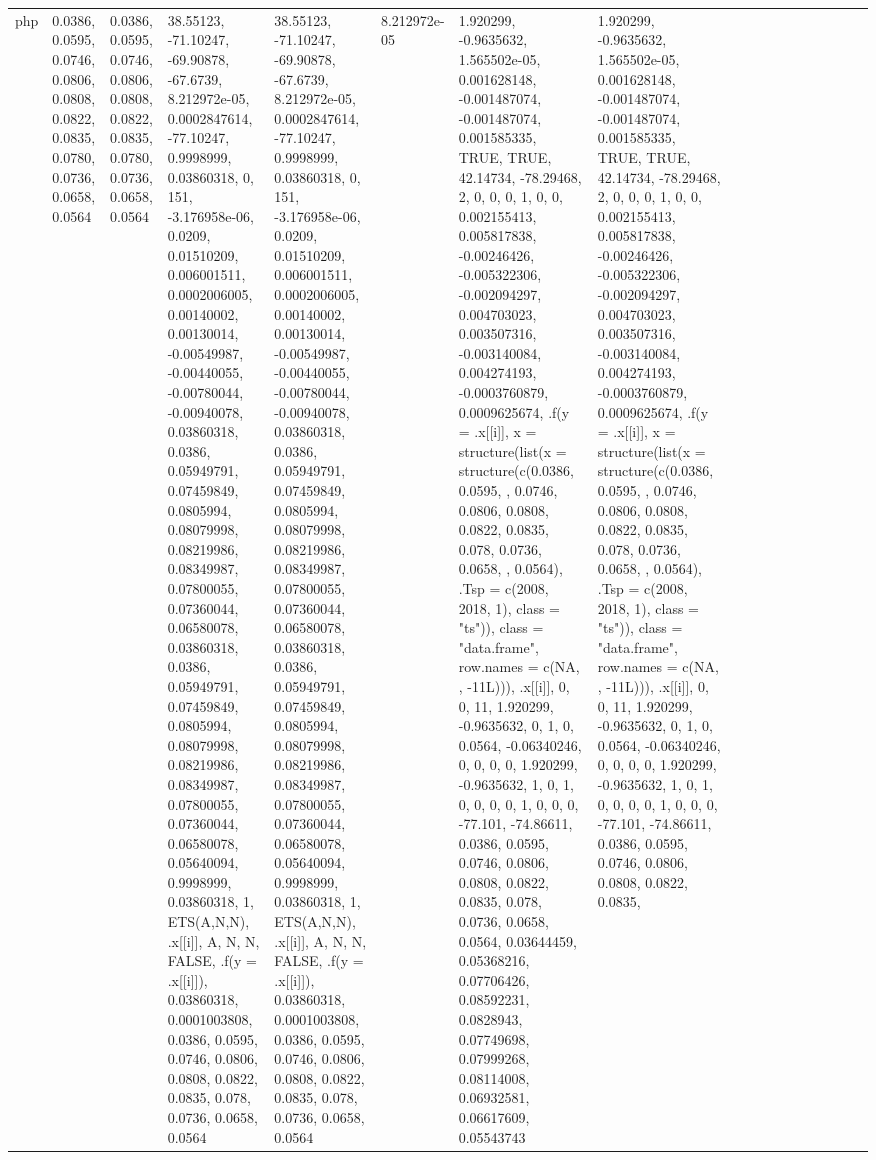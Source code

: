 \documentclass[
]{article}
\begin{document}
\begin{table}
\begin{tabular}{l|l|l|l|l|l|l|l|l|l|l|r|l|r|r|r|r|r}
php & 0.0386, 0.0595, 0.0746, 0.0806, 0.0808, 0.0822, 0.0835, 0.0780, 0.0736, 0.0658, 0.0564 & 0.0386, 0.0595, 0.0746, 0.0806, 0.0808, 0.0822, 0.0835, 0.0780, 0.0736, 0.0658, 0.0564 & 38.55123, -71.10247, -69.90878, -67.6739, 8.212972e-05, 0.0002847614, -77.10247, 0.9998999, 0.03860318, 0, 151, -3.176958e-06, 0.0209, 0.01510209, 0.006001511, 0.0002006005, 0.00140002, 0.00130014, -0.00549987, -0.00440055, -0.00780044, -0.00940078, 0.03860318, 0.0386, 0.05949791, 0.07459849, 0.0805994, 0.08079998, 0.08219986, 0.08349987, 0.07800055, 0.07360044, 0.06580078, 0.03860318, 0.0386, 0.05949791, 0.07459849, 0.0805994, 0.08079998, 0.08219986, 0.08349987, 0.07800055, 0.07360044, 0.06580078, 0.05640094, 0.9998999, 0.03860318, 1, ETS(A,N,N), .x[[i]], A, N, N, FALSE, .f(y = .x[[i]]), 0.03860318, 0.0001003808, 0.0386, 0.0595, 0.0746, 0.0806, 0.0808, 0.0822, 0.0835, 0.078, 0.0736, 0.0658, 0.0564 & 38.55123, -71.10247, -69.90878, -67.6739, 8.212972e-05, 0.0002847614, -77.10247, 0.9998999, 0.03860318, 0, 151, -3.176958e-06, 0.0209, 0.01510209, 0.006001511, 0.0002006005, 0.00140002, 0.00130014, -0.00549987, -0.00440055, -0.00780044, -0.00940078, 0.03860318, 0.0386, 0.05949791, 0.07459849, 0.0805994, 0.08079998, 0.08219986, 0.08349987, 0.07800055, 0.07360044, 0.06580078, 0.03860318, 0.0386, 0.05949791, 0.07459849, 0.0805994, 0.08079998, 0.08219986, 0.08349987, 0.07800055, 0.07360044, 0.06580078, 0.05640094, 0.9998999, 0.03860318, 1, ETS(A,N,N), .x[[i]], A, N, N, FALSE, .f(y = .x[[i]]), 0.03860318, 0.0001003808, 0.0386, 0.0595, 0.0746, 0.0806, 0.0808, 0.0822, 0.0835, 0.078, 0.0736, 0.0658, 0.0564 & 8.212972e-05 & 1.920299, -0.9635632, 1.565502e-05, 0.001628148, -0.001487074, -0.001487074, 0.001585335, TRUE, TRUE, 42.14734, -78.29468, 2, 0, 0, 0, 1, 0, 0, 0.002155413, 0.005817838, -0.00246426, -0.005322306, -0.002094297, 0.004703023, 0.003507316, -0.003140084, 0.004274193, -0.0003760879, 0.0009625674, .f(y = .x[[i]], x = structure(list(x = structure(c(0.0386, 0.0595, , 0.0746, 0.0806, 0.0808, 0.0822, 0.0835, 0.078, 0.0736, 0.0658, , 0.0564), .Tsp = c(2008, 2018, 1), class = "ts")), class = "data.frame", row.names = c(NA, , -11L))), .x[[i]], 0, 0, 11, 1.920299, -0.9635632, 0, 1, 0, 0.0564, -0.06340246, 0, 0, 0, 0, 1.920299, -0.9635632, 1, 0, 1, 0, 0, 0, 0, 1, 0, 0, 0, -77.101, -74.86611, 0.0386, 0.0595, 0.0746, 0.0806, 0.0808, 0.0822, 0.0835, 0.078, 0.0736, 0.0658, 0.0564, 0.03644459, 0.05368216, 0.07706426, 0.08592231, 0.0828943, 0.07749698, 0.07999268, 0.08114008, 0.06932581, 0.06617609, 0.05543743 & 1.920299, -0.9635632, 1.565502e-05, 0.001628148, -0.001487074, -0.001487074, 0.001585335, TRUE, TRUE, 42.14734, -78.29468, 2, 0, 0, 0, 1, 0, 0, 0.002155413, 0.005817838, -0.00246426, -0.005322306, -0.002094297, 0.004703023, 0.003507316, -0.003140084, 0.004274193, -0.0003760879, 0.0009625674, .f(y = .x[[i]], x = structure(list(x = structure(c(0.0386, 0.0595, , 0.0746, 0.0806, 0.0808, 0.0822, 0.0835, 0.078, 0.0736, 0.0658, , 0.0564), .Tsp = c(2008, 2018, 1), class = "ts")), class = "data.frame", row.names = c(NA, , -11L))), .x[[i]], 0, 0, 11, 1.920299, -0.9635632, 0, 1, 0, 0.0564, -0.06340246, 0, 0, 0, 0, 1.920299, -0.9635632, 1, 0, 1, 0, 0, 0, 0, 1, 0, 0, 0, -77.101, -74.86611, 0.0386, 0.0595, 0.0746, 0.0806, 0.0808, 0.0822, 0.0835, 
\end{tabular}
\end{table}
\end{document}
